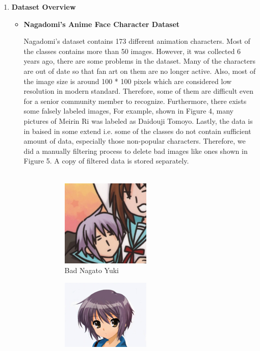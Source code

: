 \documentclass[11.5pt]{article}
\begin{document}
    \begin{enumerate}
        \item \textbf{Dataset Overview}
        \begin{itemize}
            \item \textbf{Nagadomi's Anime Face Character Dataset}

            Nagadomi's dataset contains 173 different animation characters. Most of the classes contains more than 50 images. However, it was collected 6 years ago, there are some problems in the dataset. Many of the characters are out of date so that fan art on them are no longer active. Also, most of the image size is around 100 * 100 pixels which are considered low resolution in modern standard. Therefore, some of them are difficult even for a senior community member to recognize. Furthermore, there exists some falsely labeled images, For example, shown in Figure 4, many pictures of Meirin Ri was labeled as Daidouji Tomoyo. Lastly, the data is in baised in some extend i.e. some of the classes do not contain sufficient amount of data, especially those non-popular characters.
            Therefore, we did a manually filtering process to delete bad images like ones shown in Figure 5. A copy of filtered data is stored separately.\\ \\
            \begin{figure}[h!]
                \begin{subfigure}[h]{0.5\linewidth}
                    \centering
                    \includegraphics[width=0.5\linewidth, scale=0.5]{images/face_145_303_113.png}
                    \caption{Bad Nagato Yuki}
                \end{subfigure}
                \begin{subfigure}[h]{0.5\linewidth}
                    \centering
                    \includegraphics[width=0.5\linewidth, scale=0.5]{images/face_235_235_128.png}

\end{subfigure}
\end{figure}
\end{itemize}
\end{enumerate}
\end{document}

